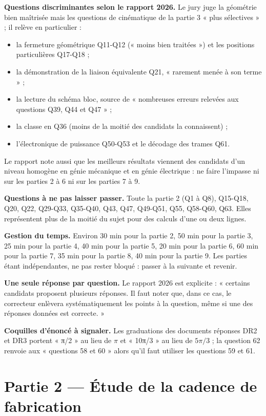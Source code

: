 \documentclass[11pt,a4paper]{article}
\providecommand{\tightlist}{\setlength{\itemsep}{0pt}\setlength{\parskip}{0pt}}
\begin{document}
\textbf{Questions discriminantes selon le rapport 2026.} Le jury juge la géométrie bien maîtrisée mais les questions de cinématique de la partie 3 « plus sélectives » ; il relève en particulier :

\begin{itemize}
\tightlist
\item
  la fermeture géométrique Q11-Q12 (« moins bien traitées ») et les positions particulières Q17-Q18 ;
\item
  la démonstration de la liaison équivalente Q21, « rarement menée à son terme » ;
\item
  la lecture du schéma bloc, source de « nombreuses erreurs relevées aux questions Q39, Q44 et Q47 » ;
\item
  la classe en Q36 (moins de la moitié des candidats la connaissent) ;
\item
  l'électronique de puissance Q50-Q53 et le décodage des trames Q61.
\end{itemize}

Le rapport note aussi que les meilleurs résultats viennent des candidats d'un niveau homogène en génie mécanique et en génie électrique : ne faire l'impasse ni sur les parties 2 à 6 ni sur les parties 7 à 9.

\textbf{Questions à ne pas laisser passer.} Toute la partie 2 (Q1 à Q8), Q15-Q18, Q20, Q22, Q29-Q33, Q35-Q40, Q43, Q47, Q49-Q51, Q55, Q58-Q60, Q63. Elles représentent plus de la moitié du sujet pour des calculs d'une ou deux lignes.

\textbf{Gestion du temps.} Environ 30 min pour la partie 2, 50 min pour la partie 3, 25 min pour la partie 4, 40 min pour la partie 5, 20 min pour la partie 6, 60 min pour la partie 7, 35 min pour la partie 8, 40 min pour la partie 9. Les parties étant indépendantes, ne pas rester bloqué : passer à la suivante et revenir.

\textbf{Une seule réponse par question.} Le rapport 2026 est explicite : « certains candidats proposent plusieurs réponses. Il faut noter que, dans ce cas, le correcteur enlèvera systématiquement les points à la question, même si une des réponses données est correcte. »

\textbf{Coquilles d'énoncé à signaler.} Les graduations des documents réponses DR2 et DR3 portent « π/2 » au lieu de \(\pi\) et « 10π/3 » au lieu de \(5\pi/3\) ; la question 62 renvoie aux « questions 58 et 60 » alors qu'il faut utiliser les questions 59 et 61.

\hypertarget{partie-2-uxe9tude-de-la-cadence-de-fabrication}{%
\section{Partie 2 --- Étude de la cadence de fabrication}\label{partie-2-uxe9tude-de-la-cadence-de-fabrication}}
\end{document}
